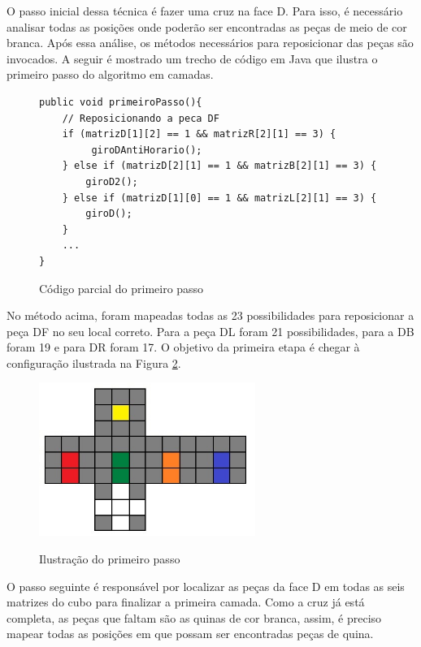 O passo inicial dessa técnica é fazer uma cruz na face D. Para isso, é necessário analisar todas as posições onde poderão ser encontradas as peças de meio de cor branca. Após essa análise, os métodos necessários para reposicionar das peças são invocados. A seguir é mostrado um trecho de código em Java que ilustra o primeiro passo do algoritmo em camadas.

\begin{figure}[!htb]
\begin{lstlisting}
public void primeiroPasso(){
    // Reposicionando a peca DF 
    if (matrizD[1][2] == 1 && matrizR[2][1] == 3) {
         giroDAntiHorario();
    } else if (matrizD[2][1] == 1 && matrizB[2][1] == 3) {
        giroD2();
    } else if (matrizD[1][0] == 1 && matrizL[2][1] == 3) {
        giroD();
    }
    ...
}
\end{lstlisting}
\caption{Código parcial do primeiro passo}
\label{fig:figcoasasqd1}
\end{figure}

No método acima, foram mapeadas todas as 23 possibilidades para reposicionar a peça DF no seu local correto. Para a peça DL foram 21 possibilidades, para a DB foram 19 e para DR foram 17. O objetivo da primeira etapa é chegar à configuração ilustrada na Figura \ref{fig:primeiroPasso}.

\begin{figure}[!htb]
    \centering
    {
        \includegraphics[height=5cm]{imagens/primeiroPasso.jpg}
        \label{figFront}
    }
    
\caption{Ilustração do primeiro passo}
\label{fig:primeiroPasso}
\end{figure}


O passo seguinte é responsável por localizar as peças da face D em todas as seis matrizes do cubo para finalizar a primeira camada. Como a cruz já está completa, as peças que faltam são as quinas de cor branca, assim, é preciso mapear todas as posições em que possam ser encontradas peças de quina. 

